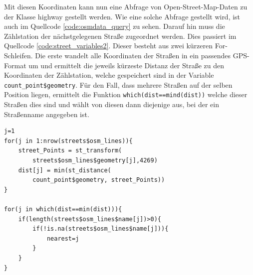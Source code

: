 \documentclass[a4paper,12pt]{thesis}
\begin{document}
Mit diesen Koordinaten kann nun eine Abfrage von Open-Street-Map-Daten zu der Klasse \glqq{}highway\grqq{} gestellt werden. Wie eine solche Abfrage gestellt wird, ist auch im Quellcode \ref{code:osmdata_query} zu sehen. Darauf hin muss die Zählstation der nächstgelegenen Straße zugeordnet werden. Dies passiert im Quellcode \ref{code:street_variables2}. Dieser besteht aus zwei kürzeren For-Schleifen. Die erste wandelt alle Koordinaten der Straßen in ein passendes GPS-Format um und ermittelt die jeweils kürzeste Distanz der Straße zu den Koordinaten der Zählstation, welche gespeichert sind in der Variable \lstinline|count_point$geometry|. Für den Fall, dass mehrere Straßen auf der selben Position liegen, ermittelt die Funktion \lstinline|which(dist==mind(dist))| welche dieser Straßen dies sind und wählt von diesen dann diejenige aus, bei der ein Straßenname angegeben ist.

\begin{minipage}{\linewidth}
\begin{lstlisting}[caption={Zuordnung zur nächsten Straße},label=code:street_variables2]
j=1
for(j in 1:nrow(streets$osm_lines)){
	street_Points = st_transform(
		streets$osm_lines$geometry[j],4269)
	dist[j] = min(st_distance(
		count_point$geometry, street_Points))
}
	
for(j in which(dist==min(dist))){
	if(length(streets$osm_lines$name[j])>0){
		if(!is.na(streets$osm_lines$name[j])){
			nearest=j
		}
	}
}
\end{lstlisting}
\end{minipage}
\end{document}
